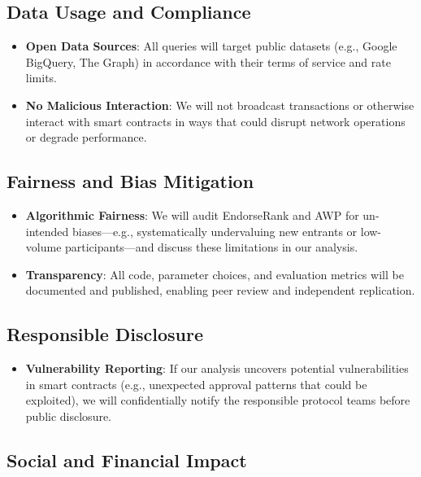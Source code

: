 \documentclass[
]{article}
\begin{document}
\subsection{Data Usage and Compliance}\label{data-usage-and-compliance}

\begin{itemize}
\item
  \textbf{Open Data Sources}: All queries will target public datasets (e.g., Google BigQuery, The Graph) in accordance with their terms of service and rate limits.
\item
  \textbf{No Malicious Interaction}: We will not broadcast transactions or otherwise interact with smart contracts in ways that could disrupt network operations or degrade performance.
\end{itemize}

\subsection{Fairness and Bias Mitigation}\label{fairness-and-bias-mitigation}

\begin{itemize}
\item
  \textbf{Algorithmic Fairness}: We will audit EndorseRank and AWP for un- intended biases---e.g., systematically undervaluing new entrants or low- volume participants---and discuss these limitations in our analysis.
\item
  \textbf{Transparency}: All code, parameter choices, and evaluation metrics will be documented and published, enabling peer review and independent replication.
\end{itemize}

\subsection{Responsible Disclosure}\label{responsible-disclosure}

\begin{itemize}
\item
  \textbf{Vulnerability Reporting}: If our analysis uncovers potential vulnerabilities in smart contracts (e.g., unexpected approval patterns that could be exploited), we will confidentially notify the responsible protocol teams before public disclosure.
\end{itemize}

\subsection{Social and Financial Impact}\label{social-and-financial-impact}
\end{document}
